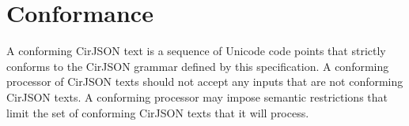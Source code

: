 
\section{Conformance}

A conforming CirJSON text is a sequence of Unicode code points that strictly conforms to the CirJSON grammar defined by this specification.
A conforming processor of CirJSON texts should not accept any inputs that are not conforming CirJSON texts.
A conforming processor may impose semantic restrictions that limit the set of conforming CirJSON texts that it will process.
